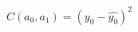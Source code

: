 \documentclass[preview]{standalone}
\begin{document}
\begin{align*}
C(a_0, a_1) = (y_0 - \hat{y_0})^2
\end{align*}
\end{document}
